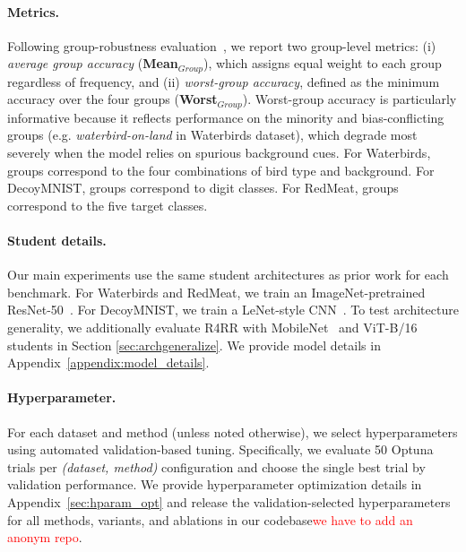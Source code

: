 \paragraph{Metrics.}
Following group-robustness evaluation~\cite{sagawa2019distributionally}, we report two group-level metrics: (i) \emph{average group accuracy} (\textbf{Mean$_{Group}$}), which assigns equal weight to each group regardless of frequency, and (ii) \emph{worst-group accuracy}, defined as the minimum accuracy over the four groups (\textbf{Worst$_{Group}$}). Worst-group accuracy is particularly informative because it reflects performance on the minority and bias-conflicting groups (e.g. \emph{waterbird-on-land} in Waterbirds dataset), which degrade most severely when the model relies on spurious background cues. For Waterbirds, groups correspond to the four combinations of bird type and background. For DecoyMNIST, groups correspond to digit classes. For RedMeat, groups correspond to the five target classes.

\paragraph{Student details.}
Our main experiments use the same student architectures as prior work for each benchmark. For Waterbirds and RedMeat, we train an ImageNet-pretrained ResNet-50~\cite{he2016deep}. For DecoyMNIST, we train a LeNet-style CNN~\cite{lecun1998gradient}. To test architecture generality, we additionally evaluate R4RR with MobileNet~\cite{howard2017mobilenets} and ViT-B/16 students in Section \ref{sec:archgeneralize}. We provide model details in Appendix~\ref{appendix:model_details}. 


\paragraph{Hyperparameter.}
For each dataset and method (unless noted otherwise), we select hyperparameters using automated validation-based tuning.
Specifically, we evaluate 50 Optuna~\cite{akiba2019optuna} trials per \emph{(dataset, method)} configuration and choose the single best trial by validation performance. We provide hyperparameter optimization details in Appendix~\ref{sec:hparam_opt} and release the validation-selected hyperparameters for all methods, variants, and ablations in our codebase\textcolor{red}{we have to add an anonym repo}.


